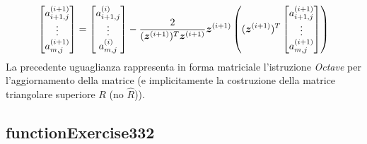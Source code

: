 \begin{oss}
\begin{displaymath}
\begin{bmatrix}
a_{i+1, j}^{(i+1)} \\
\vdots \\
a_{m, j}^{(i+1)}
\end{bmatrix} = 
\begin{bmatrix}
a_{i+1, j}^{(i)} \\
\vdots \\
a_{m, j}^{(i)}
\end{bmatrix} - \frac{2}{(\vect{z}^{(i+1)})^{T} \vect{z}^{(i+1)}} %
\vect{z}^{(i+1)} %
\left ( (\vect{z}^{(i+1)})^{T} \begin{bmatrix}
a_{i+1, j}^{(i+1)} \\
\vdots \\
a_{m, j}^{(i+1)} 
\end{bmatrix} \right )
\end{displaymath}
La precedente uguaglianza rappresenta in forma matriciale l'istruzione
\emph{Octave} per l'aggiornamento della matrice (e implicitamente la
costruzione della matrice triangolare superiore $R$ (no $\hat{R}$)).
\end{oss}



\subsection{functionExercise332}
\label{subsection:functionExercise332}
